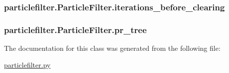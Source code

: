 \subsubsection[{iterations\+\_\+before\+\_\+clearing}]{\setlength{\rightskip}{0pt plus 5cm}particlefilter.\+Particle\+Filter.\+iterations\+\_\+before\+\_\+clearing}\label{classparticlefilter_1_1ParticleFilter_a3aee419fa01abd6a08a0b512a79d5123}
\hypertarget{classparticlefilter_1_1ParticleFilter_ad105183603f7e2a9b31ad9b51a904876}{}
\subsubsection[{pr\+\_\+tree}]{\setlength{\rightskip}{0pt plus 5cm}particlefilter.\+Particle\+Filter.\+pr\+\_\+tree}\label{classparticlefilter_1_1ParticleFilter_ad105183603f7e2a9b31ad9b51a904876}


The documentation for this class was generated from the following file\+:\begin{DoxyCompactItemize}
\item 
\hyperlink{particlefilter_8py}{particlefilter.\+py}\end{DoxyCompactItemize}
